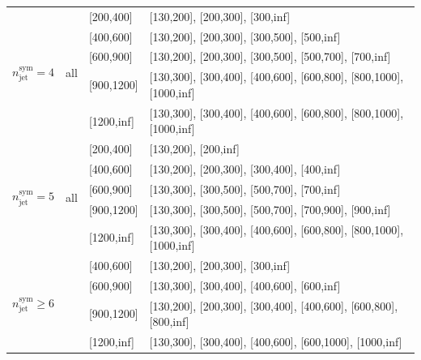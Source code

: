 \begin{table}[h!]
\begin{tabular}{ ccll }
    \hline
    \multirow{5}{*}{$n^{\mathrm{sym}}_{\mathrm{jet}} = 4$} & \multirow{5}{*}{all} & [200,400] & [130,200], [200,300], [300,inf] \\
    & & [400,600] & [130,200], [200,300], [300,500], [500,inf] \\
    & & [600,900] & [130,200], [200,300], [300,500], [500,700], [700,inf] \\
    & & [900,1200] & [130,300], [300,400], [400,600], [600,800], [800,1000], [1000,inf] \\
    & & [1200,inf] & [130,300], [300,400], [400,600], [600,800], [800,1000], [1000,inf] \\
    \hline
    \multirow{5}{*}{$n^{\mathrm{sym}}_{\mathrm{jet}} = 5$} & \multirow{5}{*}{all} & [200,400] & [130,200], [200,inf] \\
    & & [400,600] & [130,200], [200,300], [300,400], [400,inf] \\
    & & [600,900] & [130,300], [300,500], [500,700], [700,inf] \\
    & & [900,1200] & [130,300], [300,500], [500,700], [700,900], [900,inf] \\
    & & [1200,inf] & [130,300], [300,400], [400,600], [600,800], [800,1000], [1000,inf] \\
    \hline
    \multirow{5}{*}{$n^{\mathrm{sym}}_{\mathrm{jet}} \geq 6$} 
    & & [400,600] & [130,200], [200,300], [300,inf] \\
    & & [600,900] & [130,300], [300,400], [400,600], [600,inf] \\
    & & [900,1200] & [130,200], [200,300], [300,400], [400,600], [600,800], [800,inf] \\
    & & [1200,inf] & [130,300], [300,400], [400,600], [600,1000], [1000,inf] \\
    \hline
    \hline
  \end{tabular}
\end{table}
